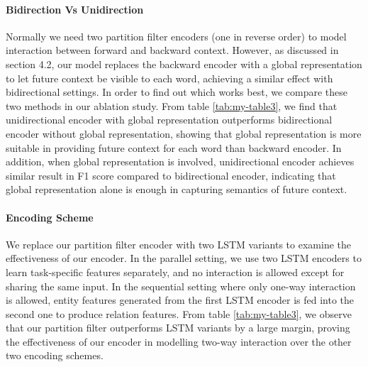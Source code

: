 \documentclass[11pt]{article}
\begin{document}
\paragraph{Bidirection Vs Unidirection}
Normally we need two partition filter encoders (one in reverse order) to model interaction between forward and backward context. However, as discussed in section 4.2, our model replaces the backward encoder with a global representation to let future context be visible to each word, achieving a similar effect with bidirectional settings. In order to find out which works best, we compare these two methods in our ablation study. From table \ref{tab:my-table3}, we find that unidirectional encoder with global representation outperforms bidirectional encoder without global representation, showing that global representation is more suitable in providing future context for each word than backward encoder. In addition, when global representation is involved, unidirectional encoder achieves similar result in F1 score compared to bidirectional encoder, indicating that global representation alone is enough in capturing semantics of future context. 


\paragraph{Encoding Scheme}
We replace our partition filter encoder with two LSTM variants to examine the effectiveness of our encoder. In the parallel setting, we use two LSTM encoders
to learn task-specific features separately, and no interaction is allowed except for sharing the same input. In the sequential setting where only one-way interaction is allowed, entity features generated from the first LSTM encoder is fed into the second one to produce relation features. From table \ref{tab:my-table3}, we observe that our partition filter outperforms LSTM variants by a large margin, proving the effectiveness of our encoder in modelling two-way interaction over the other two encoding schemes.
\end{document}
